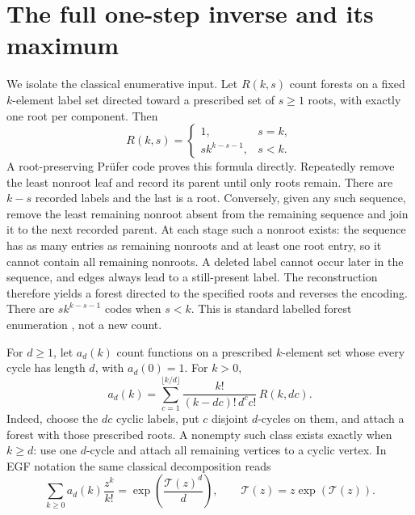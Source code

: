 \documentclass[a4paper,10pt]{amsart}
\theoremstyle{remark}
\begin{document}
\section{The full one-step inverse and its maximum}
We isolate the classical enumerative input. Let $R(k,s)$ count forests
on a fixed $k$-element label set directed toward a prescribed set of
$s\ge1$ roots, with exactly one root per component. Then
\begin{equation}\label{eq:forest}
 R(k,s)=\begin{cases}1,&s=k,\\s k^{k-s-1},&s<k.\end{cases}
\end{equation}
A root-preserving Pr\"ufer code proves this formula directly. Repeatedly
remove the least nonroot leaf and record its parent until only roots
remain. There are $k-s$ recorded labels and the last is a root. Conversely,
given any such sequence, remove the least remaining nonroot absent from
the remaining sequence and join it to the next recorded parent. At each
stage such a nonroot exists: the sequence has as many entries as remaining
nonroots and at least one root entry, so it cannot contain all remaining
nonroots. A deleted label cannot occur later in the sequence, and edges
always lead to a still-present label. The reconstruction therefore yields
a forest directed to the specified roots and reverses the encoding.
There are $s k^{k-s-1}$ codes when $s<k$. This is standard labelled
forest enumeration \cite{FlajoletSedgewick2009}, not a new count.

For $d\ge1$, let $a_d(k)$ count functions on a prescribed $k$-element
set whose every cycle has length $d$, with $a_d(0)=1$. For $k>0$,
\begin{equation}\label{eq:ad}
 a_d(k)=\sum_{c=1}^{\lfloor k/d\rfloor}
 \frac{k!}{(k-dc)!\,d^c c!}\,R(k,dc).
\end{equation}
Indeed, choose the $dc$ cyclic labels, put $c$ disjoint $d$-cycles on
them, and attach a forest with those prescribed roots. A nonempty such
class exists exactly when $k\ge d$: use one $d$-cycle and attach all
remaining vertices to a cyclic vertex. In EGF notation the same
classical decomposition reads
\begin{equation}\label{eq:egf}
 \sum_{k\ge0}a_d(k)\frac{z^k}{k!}
 =\exp\!\left(\frac{\mathcal T(z)^d}{d}\right),
 \qquad\mathcal T(z)=z\exp(\mathcal T(z)).
\end{equation}
\end{document}
